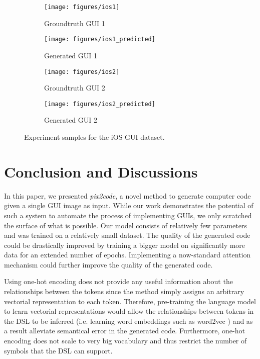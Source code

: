 \documentclass{article}
\begin{document}
\begin{figure}[H]
    \begin{subfigure}{.245\textwidth}
        \centering
        \texttt{[image: figures/ios1]}
        \caption{Groundtruth GUI 1}
    \end{subfigure}
    \begin{subfigure}{.245\textwidth}
        \centering
        \texttt{[image: figures/ios1\_predicted]}
        \caption{Generated GUI 1}
    \end{subfigure}
    \begin{subfigure}{.245\textwidth}
        \centering
        \texttt{[image: figures/ios2]}
        \caption{Groundtruth GUI 2}
    \end{subfigure}
    \begin{subfigure}{.245\textwidth}
        \centering
        \texttt{[image: figures/ios2\_predicted]}
        \caption{Generated GUI 2}
    \end{subfigure}
    \caption{Experiment samples for the iOS GUI dataset.}
    \label{fig:samples_ios}
\end{figure}

\section{Conclusion and Discussions}

In this paper, we presented \emph{pix2code}, a novel method to generate computer code given a single GUI image as input. While our work demonstrates the potential of such a system to automate the process of implementing GUIs, we only scratched the surface of what is possible. Our model consists of relatively few parameters and was trained on a relatively small dataset. The quality of the generated code could be drastically improved by training a bigger model on significantly more data for an extended number of epochs. Implementing a now-standard attention mechanism \cite{bahdanau2014neural, xu2015show} could further improve the quality of the generated code.

Using one-hot encoding does not provide any useful information about the relationships between the tokens since the method simply assigns an arbitrary vectorial representation to each token. Therefore, pre-training the language model to learn vectorial representations would allow the relationships between tokens in the DSL to be inferred (i.e. learning word embeddings such as word2vec \cite{mikolov2013distributed}) and as a result alleviate semantical error in the generated code. Furthermore, one-hot encoding does not scale to very big vocabulary and thus restrict the number of symbols that the DSL can support. 
\end{document}
